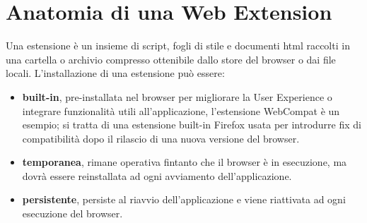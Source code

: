 \documentclass{sapthesis}
\newcommand{\bold}[1]{\textbf{#1}}
\begin{document}
    \section{Anatomia di una Web Extension }
    \label{sec:anatomia_di_una_web_extension}
        Una estensione è un insieme di script, fogli di stile e documenti html raccolti in una cartella o
        archivio compresso ottenibile dallo store del browser o dai file locali. L'installazione di una
        estensione può essere:
        \begin{itemize}
            \item \bold{built-in}, pre-installata nel browser per migliorare la User Experience
                    o integrare funzionalità utili all'applicazione, l'estensione WebCompat è un esempio;
                    si tratta di una estensione built-in Firefox usata per introdurre fix di compatibilità
                    dopo il rilascio di una nuova versione del browser.

            \item \bold{temporanea}, rimane operativa fintanto che il browser è in esecuzione, ma dovrà essere
                    reinstallata ad ogni avviamento dell'applicazione.

            \item \bold{persistente}, persiste al riavvio dell'applicazione e viene riattivata ad ogni
                    esecuzione del browser.
        \end{itemize}
        
\end{document}
